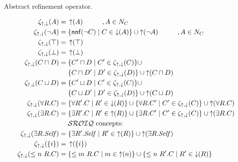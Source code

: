 \documentclass[
]{ceurart}
\begin{document}
\begin{table}[!t]
\caption{Abstract refinement operator.\label{tab:abstract-refop}}
\begin{align*}
	\zeta_{\refine,\corefine}(A) = {} & \refine(A) \hspace{10mm}, A \in N_C \\
    \zeta_{\refine,\corefine}(\lnot A) = {} & 
			 \{ \mathsf{nnf}(\lnot C) \mid C \in \corefine(A) \} \cup \refine(\lnot A) \hspace{10mm}, A \in N_C\\
	\zeta_{\refine,\corefine}(\top) = {} &  \refine(\top)\\
	\zeta_{\refine,\corefine}(\bot) = {} & \refine(\bot) \\
  \zeta_{\refine,\corefine}(C \sqcap D) = {} & 
			 \{ C' \sqcap D \mid C' \in \zeta_{\refine,\corefine}(C) \} \cup \\ & \{ C \sqcap D' \mid D' \in \zeta_{\refine,\corefine}(D) \} \cup  \refine(C \sqcap D)
    \\
     \zeta_{\refine,\corefine}(C \sqcup D) = {} & %
			 \{ C' \sqcup D \mid C' \in \zeta_{\refine,\corefine}(C) \} \cup \\ & \{ C \sqcup D' \mid D' \in \zeta_{\refine,\corefine}(D) \} \cup \refine(C \sqcup D)	%
    \\
    \zeta_{\refine,\corefine}(\forall R.C) = {} & 
			 \{ \forall R'.C \mid R' \in \corefine(R) \} \cup
			 \{ \forall R.C' \mid C' \in \zeta_{\refine,\corefine}(C) \} \cup
			 \refine(\forall R.C)
    \\
    \zeta_{\refine,\corefine}(\exists R.C) = {} &
			 \{ \exists R'.C \mid R' \in \refine(R) \} \cup
			 \{ \exists R.C' \mid C' \in \zeta_{\refine,\corefine}(C) \} \cup
			 \refine(\exists R.C)\\
	& \text{\SROIQ concepts:}\\
	\zeta_{\refine,\corefine}(\exists R.\self) = {} & \{ \exists R'. \self \mid R' \in \refine(R)\} \cup \refine(\exists R.\self)\\
	\zeta_{\refine,\corefine}(\nominal i) = {} & \refine(\nominal i) \\
	\zeta_{\refine,\corefine}(\less n R. C) = {} & \{ \less m R.C \mid m \in \refine(n) \}  \cup 
	\{ \less n R'.C \mid R' \in \corefine(R) \}

\end{align*}
\end{table}
\end{document}
